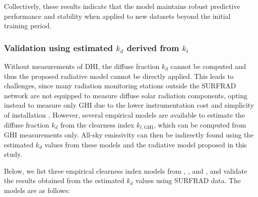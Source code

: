 \documentclass[preprint,12pt]{elsarticle}
\begin{document}
Collectively, these results indicate that the model maintains robust predictive performance and stability when applied to new datasets beyond the initial training period.

\subsubsection{Validation using estimated $k_d$ derived from $ k_t$}

Without measurements of DHI, the diffuse fraction $k_d$ cannot be computed and thus the proposed radiative model cannot be directly applied. This leads to challenges, since many radiation monitoring stations outside the SURFRAD network are not equipped to measure diffuse solar radiation components, opting instead to measure only GHI due to the lower instrumentation cost and simplicity of installation \cite{nollas2023quality,marion2015model}. However, several empirical models are available to estimate the diffuse fraction $k_d$ from the clearness index $k_{t,\mathrm{GHI}}$, which can be computed from GHI measurements only. All-sky emissivity can then be indirectly found using the estimated $k_d$ values from these models and the radiative model proposed in this study.  

Below, we list three empirical clearness index models from \cite{erbs1982estimation}, \cite{orgill1977correlation}, and \cite{reindl1990diffuse}, and validate the results obtained from the estimated $k_d$ values using SURFRAD data. The models are as follows:
\end{document}
